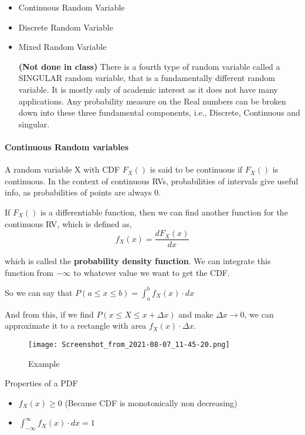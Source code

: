 \begin{itemize}
\item
  Continuous Random Variable
\item
  Discrete Random Variable
\item
  Mixed Random Variable

  \textbf{(Not done in class)} There is a fourth type of random variable
  called a SINGULAR random variable, that is a fundamentally different
  random variable. It is mostly only of academic interest as it does not
  have many applications. Any probability measure on the Real numbers
  can be broken down into these three fundamental components, i.e.,
  Discrete, Continuous and singular.
\end{itemize}

\hypertarget{continuous-random-variables}{%
\paragraph{Continuous Random
variables}\label{continuous-random-variables}}

A random variable X with CDF \(F_X()\) is said to be continuous if
\(F_X()\) is continuous. In the context of continuous RVs, probabilities
of intervals give useful info, as probabilities of points are always 0.

If \(F_X()\) is a differentiable function, then we can find another
function for the continuous RV, which is defined as,
\[f_X(x) = \frac{dF_X(x)}{dx}\]

which is called the \textbf{probability density function}. We can
integrate this function from \(-\infty\) to whatever value we want to
get the CDF.

So we can say that
\(P(a \leq x \leq b) = \displaystyle\int_{a}^{b}f_X(x)\cdot dx\)

And from this, if we find \(P(x \leq X \leq x + \Delta x)\) and make
\(\Delta x \to 0\), we can approximate it to a rectangle with area
\(f_X(x) \cdot \Delta x\).

\begin{figure}
\centering
\texttt{[image: Screenshot\_from\_2021-08-07\_11-45-20.png]}
\caption{Example}
\end{figure}

Properties of a PDF

\begin{itemize}
\tightlist
\item
  \(f_X(x) \geq 0\) (Because CDF is monotonically non decreasing)
\item
  \(\displaystyle\int_{-\infty}^{\infty}f_X(x)\cdot dx = 1\)
\end{itemize}

